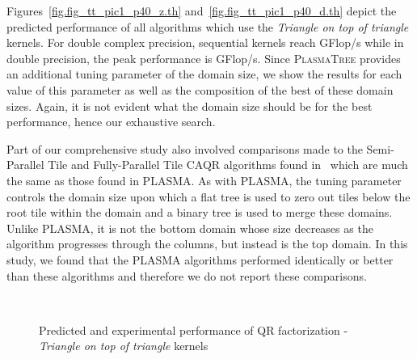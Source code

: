 \documentclass[a4paper,twopages]{article}
\newcommand{\PT}{\textsc{PlasmaTree}\xspace}
\begin{document}
Figures~\ref{fig.fig_tt_pic1_p40_z.th} and~\ref{fig.fig_tt_pic1_p40_d.th} depict
the predicted performance of all algorithms which use the \emph{Triangle on top
of triangle} kernels.  For double complex precision, sequential kernels reach
 GFlop/s while in double precision, the peak performance is 
GFlop/s.  Since \PT provides an additional tuning parameter of the domain size,
we show the results for each value of this parameter as well as the composition
of the best of these domain sizes. Again, it is not evident what the domain size
should be for the best performance, hence our exhaustive search.

Part of our comprehensive study also involved comparisons made to the
Semi-Parallel Tile and Fully-Parallel Tile CAQR algorithms found
in~\cite{Hadri_enhancingparallelism} which are much the same as those found in
PLASMA.  As with PLASMA, the tuning parameter  controls the domain size
upon which a flat tree is used to zero out tiles below the root tile within the
domain and a binary tree is used to merge these domains.  Unlike PLASMA, it is
not the bottom domain whose size decreases as the algorithm progresses through
the columns, but instead is the top domain.  In this study, we found that the
PLASMA algorithms performed identically or better than these algorithms and
therefore we do not report these comparisons.

\begin{sidewaysfigure*}
\centering
{}
\\
\caption{\label{fig.fig_tt_pic1_p40}Predicted and experimental performance of QR factorization - \emph{Triangle on top of triangle} kernels}
\end{sidewaysfigure*}
\end{document}
